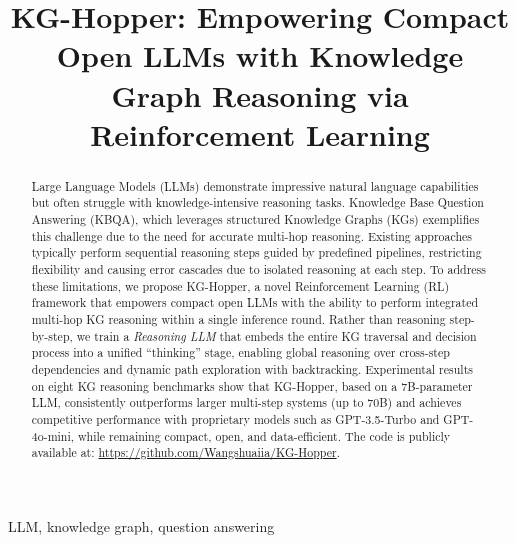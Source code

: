 \documentclass[10pt,conference]{IEEEtran}
\begin{document}
\title{KG-Hopper: Empowering Compact Open LLMs with Knowledge Graph Reasoning via Reinforcement Learning}

\author{
}

\maketitle




\begin{abstract}
Large Language Models (LLMs) demonstrate impressive natural language capabilities but often struggle with knowledge-intensive reasoning tasks. Knowledge Base Question Answering (KBQA), which leverages structured Knowledge Graphs (KGs) exemplifies this challenge due to the need for accurate multi-hop reasoning. Existing approaches typically perform sequential reasoning steps guided by predefined pipelines, restricting flexibility and causing error cascades due to isolated reasoning at each step. To address these limitations, we propose KG-Hopper, a novel Reinforcement Learning (RL) framework that empowers compact open LLMs with the ability to perform integrated multi-hop KG reasoning  within a single inference round. Rather than reasoning step-by-step, we train a \textit{Reasoning LLM} that embeds the entire KG traversal and decision process into a unified “thinking” stage, enabling global reasoning over cross-step dependencies and dynamic path exploration with backtracking. Experimental results on eight KG reasoning benchmarks show that KG-Hopper, based on a 7B-parameter LLM, consistently outperforms larger multi-step systems (up to 70B) and achieves competitive performance with proprietary models such as GPT-3.5-Turbo and GPT-4o-mini, while remaining compact, open, and data-efficient. 
The code is publicly available at:
\url{https://github.com/Wangshuaiia/KG-Hopper}.
\end{abstract}

\begin{IEEEkeywords}
LLM, knowledge graph, question answering
\end{IEEEkeywords}
\end{document}
